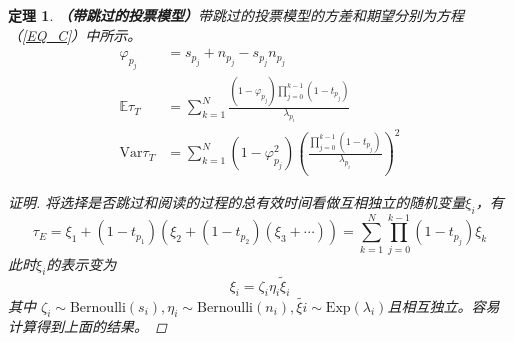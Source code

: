 \documentclass[UTF8]{ctexart}
\theoremstyle{plain}
\newtheorem{thm}{定理}[section]
\theoremstyle{definition}
\theoremstyle{remark}
\begin{document}
	\begin{thm}\textbf{（带跳过的投票模型）}带跳过的投票模型的方差和期望分别为方程（\ref{EQ_C}）中所示。
		\begin{equation*}
		\begin{aligned}
		\varphi_{p_j} & = s_{p_j} + n_{p_j} - s_{p_j}n_{p_j} \\
		\mathbb{E} \tau_T & = \sum_{k=1}^N \frac{(1-\varphi_{p_j})\prod\limits_{j=0}^{k-1}(1-t_{p_j})}{\lambda_{p_i}} \\
		\mathrm{Var} \tau_T & = \sum_{k=1}^N (1-\varphi_{p_j}^2)\left(\frac{\prod\limits_{j=0}^{k-1}(1-t_{p_j})}{\lambda_{p_i}}\right)^2
		\end{aligned}
		\end{equation*}
		\begin{proof}[证明]
			将选择是否跳过和阅读的过程的总有效时间看做互相独立的随机变量$\xi_i$，有
			$$
			\tau_E = \xi_1 + (1-t_{p_1})(\xi_2 + (1-t_{p_2})(\xi_3+\cdots)) = \sum_{k=1}^N \prod_{j=0}^{k-1} (1-t_{p_j}) \xi_k
			$$
			此时$\xi_i$的表示变为
			$$
			\xi_i = \zeta_i \eta_i \tilde{\xi}_i
			$$
			其中
			$\zeta_i \sim \mathrm{Bernoulli}(s_i), \eta_i \sim \mathrm{Bernoulli}(n_i), \tilde{\xi{i}} \sim \mathrm{Exp}(\lambda_i)$且相互独立。容易计算得到上面的结果。
		\end{proof}
	\end{thm}
\end{document}
